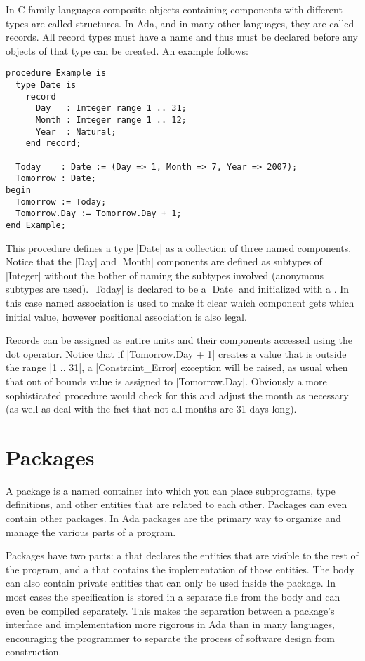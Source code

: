In C family languages composite objects containing components with different types are called
structures. In Ada, and in many other languages, they are called records. All record types must
have a name and thus must be declared before any objects of that type can be created. An example
follows:

\begin{lstlisting}
procedure Example is
  type Date is
    record
      Day   : Integer range 1 .. 31;
      Month : Integer range 1 .. 12;
      Year  : Natural;
    end record;

  Today    : Date := (Day => 1, Month => 7, Year => 2007);
  Tomorrow : Date;
begin
  Tomorrow := Today;
  Tomorrow.Day := Tomorrow.Day + 1;
end Example;
\end{lstlisting}

This procedure defines a type |Date| as a collection of three named components. Notice that the
|Day| and |Month| components are defined as subtypes of |Integer| without the bother of naming
the subtypes involved (anonymous subtypes are used). |Today| is declared to be a |Date| and
initialized with a . In this case named association is used to make it
clear which component gets which initial value, however positional association is also legal.

Records can be assigned as entire units and their components accessed using the dot operator.
Notice that if |Tomorrow.Day + 1| creates a value that is outside the range |1 .. 31|, a
|Constraint_Error| exception will be raised, as usual when that out of bounds value is assigned
to |Tomorrow.Day|. Obviously a more sophisticated procedure would check for this and adjust the
month as necessary (as well as deal with the fact that not all months are 31 days long).


\section{Packages}
\label{sec:packages}

A package is a named container into which you can place subprograms, type definitions, and other
entities that are related to each other. Packages can even contain other packages. In Ada
packages are the primary way to organize and manage the various parts of a program.

Packages have two parts: a  that declares the entities that are visible
to the rest of the program, and a  that contains the implementation of those
entities. The body can also contain private entities that can only be used inside the package.
In most cases the specification is stored in a separate file from the body and can even be
compiled separately. This makes the separation between a package's interface and implementation
more rigorous in Ada than in many languages, encouraging the programmer to separate the process
of software design from construction.

